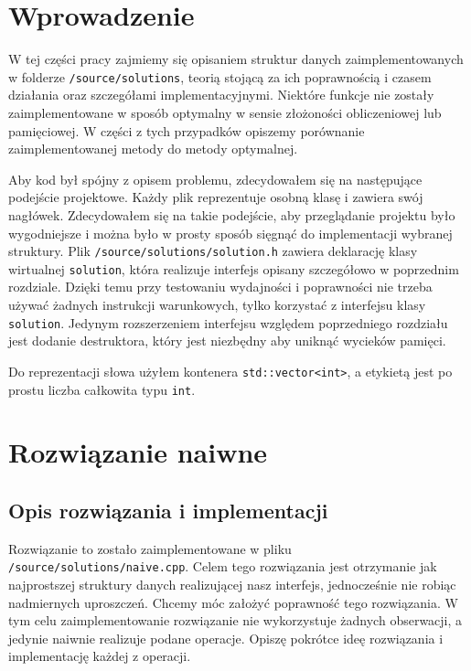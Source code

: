 \documentclass[declaration,shortabstract]{iithesis}
\theoremstyle{definition} \newtheorem{definition}{Definicja}[chapter]
\theoremstyle{remark} \newtheorem{remark}[definition]{Obserwacja}
\theoremstyle{plain} \newtheorem{theorem}[definition]{Twierdzenie}
\theoremstyle{remark} \newtheorem{example}{Przykład}[definition]
\theoremstyle{plain} \newtheorem{lemma}[definition]{Lemat}
\begin{document}
\section{Wprowadzenie}

W tej części pracy zajmiemy się opisaniem struktur danych zaimplementowanych w folderze \texttt{/source/solutions}, teorią stojącą za ich poprawnością i czasem działania oraz szczegółami implementacyjnymi. Niektóre funkcje nie zostały zaimplementowane w sposób optymalny w sensie złożoności obliczeniowej lub pamięciowej. W części z tych przypadków opiszemy porównanie zaimplementowanej metody do metody optymalnej.

Aby kod był spójny z opisem problemu, zdecydowałem się na następujące podejście projektowe. Każdy plik reprezentuje osobną klasę i zawiera swój nagłówek. Zdecydowałem się na takie podejście, aby przeglądanie projektu było wygodniejsze i można było w prosty sposób sięgnąć do implementacji wybranej struktury. Plik \texttt{/source/solutions/solution.h} zawiera deklarację klasy wirtualnej \texttt{solution}, która realizuje interfejs opisany szczegółowo w poprzednim rozdziale. Dzięki temu przy testowaniu wydajności i poprawności nie trzeba używać żadnych instrukcji warunkowych, tylko korzystać z interfejsu klasy \texttt{solution}. Jedynym rozszerzeniem interfejsu względem poprzedniego rozdziału jest dodanie destruktora, który jest niezbędny aby uniknąć wycieków pamięci.

Do reprezentacji słowa użyłem kontenera \texttt{std::vector<int>}, a etykietą jest po prostu liczba całkowita typu \texttt{int}.

\section{Rozwiązanie naiwne}

\subsection{Opis rozwiązania i implementacji}

Rozwiązanie to zostało zaimplementowane w pliku \texttt{/source/solutions/naive.cpp}. Celem tego rozwiązania jest otrzymanie jak najprostszej struktury danych realizującej nasz interfejs, jednocześnie nie robiąc nadmiernych uproszczeń. Chcemy móc założyć poprawność tego rozwiązania. W tym celu zaimplementowanie rozwiązanie nie wykorzystuje żadnych obserwacji, a jedynie naiwnie realizuje podane operacje. Opiszę pokrótce ideę rozwiązania i implementację każdej z operacji.
\end{document}
